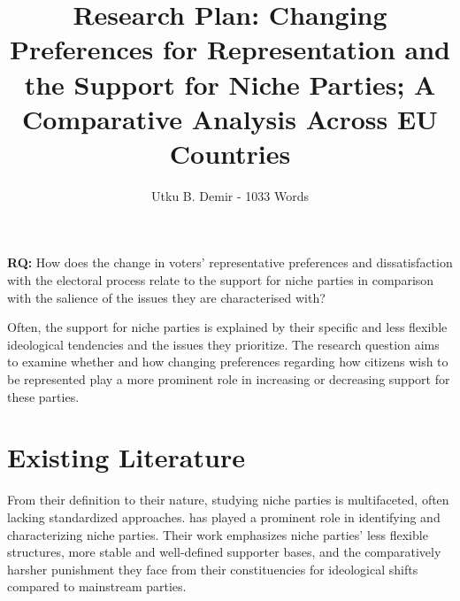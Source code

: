 

\makeatletter
\renewcommand{\maketitlepage}{%
  \begingroup%
  \thispagestyle{empty}
  \setlength{\parindent}{0pt}

  {\fontsize{12}{12}\selectfont{\@author}\par}

  \vspace{2cm}
  {\fontsize{14}{14}\selectfont\textbf\@title\par}

  \vspace{3cm}

  \endgroup
}
\makeatother

\title{Research Plan: Changing Preferences for Representation and the Support for Niche Parties; A Comparative Analysis Across EU Countries}
\author{Utku B. Demir - 1033 Words}



\maketitle

\textbf{RQ:} How does the change in voters’ representative preferences and dissatisfaction with the electoral process relate to the support for niche parties in comparison with the salience of the issues they are characterised with?

Often, the support for niche parties is explained by their specific and less flexible \parencite[525]{adams2006} ideological tendencies and the issues they prioritize. The research question aims to examine whether and how changing preferences regarding how citizens wish to be represented play a more prominent role in increasing or decreasing support for these parties.


\section{Existing Literature}\label{sec:Existing Literature} %
From their definition to their nature, studying niche parties is multifaceted, often lacking standardized approaches. \textcite{adams2006} has played a prominent role in identifying and characterizing niche parties. Their work emphasizes niche parties’ less flexible structures, more stable and well-defined supporter bases, and the comparatively harsher punishment they face from their constituencies for ideological shifts compared to mainstream parties.

